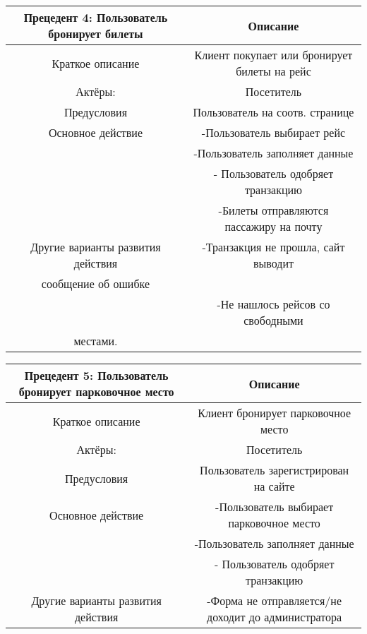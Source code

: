\begin{table}
    \begin{tabular}{|c|c|}
    \hline
    Прецедент 4: Пользователь бронирует билеты          & Описание                                                                                              \\ \hline
    Краткое описание                  & Клиент покупает или бронирует билеты на рейс                                                           \\ \hline
    Актёры:                           & Посетитель                                                                                         \\ \hline
    Предусловия                       & Пользователь на соотв. странице                                                                                                   \\ \hline
    Основное действие                 & -Пользователь выбирает рейс\\ &-Пользователь заполняет данные\\ &- Пользователь одобряет транзакцию\\ 
    &-Билеты отправляются пассажиру на почту\\ \hline
    Другие варианты развития действия & -Транзакция не прошла, сайт выводит\\ сообщение об ошибке\\ &-Не нашлось рейсов со свободными\\ местами.                                          \\ \hline
    \end{tabular}
\end{table}

\begin{table}
    \begin{tabular}{|c|c|}
    \hline
    Прецедент 5: Пользователь бронирует парковочное место          & Описание                                                                                              \\ \hline
    Краткое описание                  & Клиент бронирует парковочное место                                                           \\ \hline
    Актёры:                           & Посетитель                                                                                         \\ \hline
    Предусловия                       & Пользователь зарегистрирован на сайте                                                                                                  \\ \hline
    Основное действие                 & -Пользователь выбирает парковочное место\\ &-Пользователь заполняет данные\\ &- Пользователь одобряет транзакцию\\ \hline
    Другие варианты развития действия & -Форма не отправляется/не доходит до администратора                                                 \\ \hline
    \end{tabular}
\end{table}

